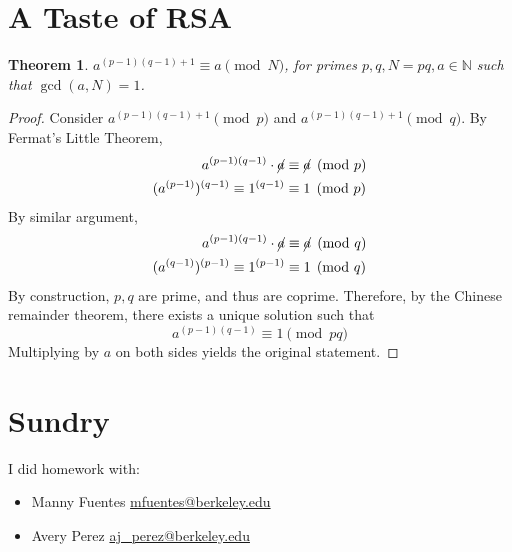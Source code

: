 \documentclass{article}
\newtheorem{theorem}{Theorem}
\newcommand{\N}{\mathbb{N}}
\begin{document}
\section{A Taste of RSA}

\begin{theorem}
    \(a^{(p - 1)(q - 1) + 1} \equiv a \pmod{N}\), for primes \(p, q, N = pq, a \in \N\) such that \(\gcd(a, N) = 1\).
\end{theorem}
\begin{proof}
    Consider \(a^{(p - 1)(q - 1) + 1} \pmod{p}\) and \(a^{(p - 1)(q - 1) + 1} \pmod{q}\).
    By Fermat's Little Theorem,
    \begin{align}
        a^{(p - 1)(q - 1)} \cdot \cancel{a} &\equiv \cancel{a} \pmod{p} \\
        (a^{(p - 1)})^{(q - 1)} \equiv 1^{(q - 1)} &\equiv 1 \pmod{p}
    \end{align}
    By similar argument,
    \begin{align}
        a^{(p - 1)(q - 1)} \cdot \cancel{a} &\equiv \cancel{a} \pmod{q} \\
        (a^{(q - 1)})^{(p - 1)} \equiv 1^{(p - 1)} &\equiv 1 \pmod{q}
    \end{align}
    By construction, \(p, q\) are prime, and thus are coprime.
    Therefore, by the Chinese remainder theorem, there exists a unique solution such that
    \begin{equation}
        a^{(p - 1)(q - 1)} \equiv 1 \pmod{pq}
    \end{equation}
    Multiplying by \(a\) on both sides yields the original statement.
\end{proof}

\section{Sundry}

I did homework with:
\begin{itemize}
    \item Manny Fuentes \href{mailto:mfuentes@berkeley.edu}{mfuentes@berkeley.edu}
    \item Avery Perez \href{mailto:aj_perez@berkeley.edu}{aj\_perez@berkeley.edu}
\end{itemize}
\end{document}
